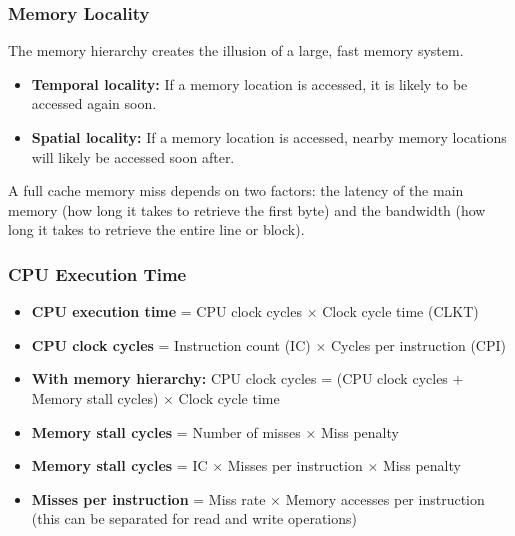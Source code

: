 \begin{frame}
    \frametitle{Memory Locality}
    The memory hierarchy creates the illusion of a large, fast memory system.
    \begin{itemize}
        \item \textbf{Temporal locality:} If a memory location is accessed, it is likely to be accessed again soon.
        \item \textbf{Spatial locality:} If a memory location is accessed, nearby memory locations will likely be accessed soon after.
    \end{itemize}
    A full cache memory miss depends on two factors: the latency of the main memory (how long it takes to retrieve the first byte) and the bandwidth (how long it takes to retrieve the entire line or block).
\end{frame}

\begin{frame}
    \frametitle{CPU Execution Time}
    \begin{itemize}
        \item \textbf{CPU execution time} = CPU clock cycles $\times$ Clock cycle time (CLKT)
        \item \textbf{CPU clock cycles} = Instruction count (IC) $\times$ Cycles per instruction (CPI)
        \item \textbf{With memory hierarchy:} CPU clock cycles = (CPU clock cycles $+$ Memory stall cycles) $\times$ Clock cycle time
        \item \textbf{Memory stall cycles} = Number of misses $\times$ Miss penalty
        \item \textbf{Memory stall cycles} = IC $\times$ Misses per instruction $\times$ Miss penalty
        \item \textbf{Misses per instruction} = Miss rate $\times$ Memory accesses per instruction (this can be separated for read and write operations)
    \end{itemize}
\end{frame}